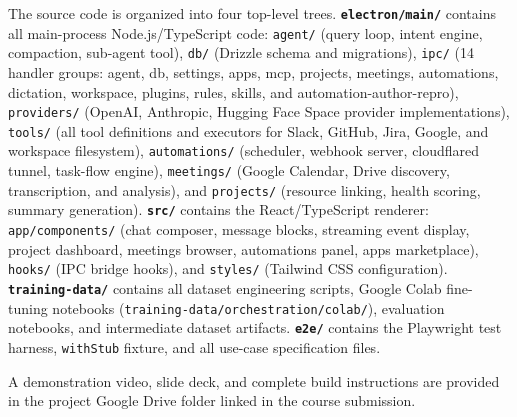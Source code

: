 \documentclass[conference]{IEEEtran}
\begin{document}
The source code is organized into four top-level trees. \textbf{\texttt{electron/main/}} contains all main-process Node.js/TypeScript code: \texttt{agent/} (query loop, intent engine, compaction, sub-agent tool), \texttt{db/} (Drizzle schema and migrations), \texttt{ipc/} (14 handler groups: agent, db, settings, apps, mcp, projects, meetings, automations, dictation, workspace, plugins, rules, skills, and automation-author-repro), \texttt{providers/} (OpenAI, Anthropic, Hugging Face Space provider implementations), \texttt{tools/} (all tool definitions and executors for Slack, GitHub, Jira, Google, and workspace filesystem), \texttt{automations/} (scheduler, webhook server, cloudflared tunnel, task-flow engine), \texttt{meetings/} (Google Calendar, Drive discovery, transcription, and analysis), and \texttt{projects/} (resource linking, health scoring, summary generation). \textbf{\texttt{src/}} contains the React/TypeScript renderer: \texttt{app/components/} (chat composer, message blocks, streaming event display, project dashboard, meetings browser, automations panel, apps marketplace), \texttt{hooks/} (IPC bridge hooks), and \texttt{styles/} (Tailwind CSS configuration). \textbf{\texttt{training-data/}} contains all dataset engineering scripts, Google Colab fine-tuning notebooks (\texttt{training-data/orchestration/colab/}), evaluation notebooks, and intermediate dataset artifacts. \textbf{\texttt{e2e/}} contains the Playwright test harness, \texttt{withStub} fixture, and all use-case specification files.

A demonstration video, slide deck, and complete build instructions are provided in the project Google Drive folder linked in the course submission.

\balance


\end{document}

